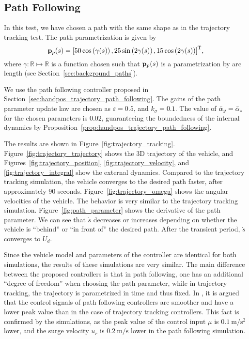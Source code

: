 \subsection{Path Following}


In this test, we have chosen a path with the same shape as in the trajectory tracking test.
The path parametrization is given by
\begin{equation}
    \mathbf{p}_p(s) = \left[50\cos\left(\gamma(s)\right), 25\sin\left(2\gamma(s)\right), 15\cos\left(2\gamma(s)\right)\right]^{\mathrm{T}}\!,
\end{equation}
where $\gamma: \mathbb{R} \mapsto \mathbb{R}$ is a function chosen such that $\mathbf{p}_p(s)$ is a parametrization by arc length (see Section~\ref{sec:background_paths}).

We use the path following controller proposed in Section~\ref{sec:handpos_trajectory_path_following}.
The gains of the path parameter update law are chosen as $\varepsilon = 0.5$, and $k_{\sigma} = 0.1$.
The value of $\Bar{\alpha}_y = \Bar{\alpha}_z$ for the chosen parameters is $0.02$, guaranteeing the boundedness of the internal dynamics by Proposition~\ref{prop:handpos_trajectory_path_following}.

The results are shown in Figure~\ref{fig:trajectory_tracking}.
Figure~\ref{fig:trajectory_trajectory} shows the 3D trajectory of the vehicle, and Figures~\ref{fig:trajectory_position}, \ref{fig:trajectory_velocity}, and \ref{fig:trajectory_integral} show the external dynamics.
Compared to the trajectory tracking simulation, the vehicle converges to the desired path faster, after approximately $90$ seconds.
Figure~\ref{fig:trajectory_omega} shows the angular velocities of the vehicle.
The behavior is very similar to the trajectory tracking simulation.
Figure~\ref{fig:path_parameter} shows the derivative of the path parameter.
We can see that $\dot{s}$ decreases or increases depending on whether the vehicle is ``behind'' or ``in front of'' the desired path.
After the transient period, $\dot{s}$ converges to $U_d$.

Since the vehicle model and parameters of the controller are identical for both simulations, the results of these simulations are very similar.
The main difference between the proposed controllers is that in path following, one has an additional ``degree of freedom'' when choosing the path parameter, while in trajectory tracking, the trajectory is parametrized in time and thus fixed.
In \cite{aguiar_trajectory_tracking_2007}, it is argued that the control signals of path following controllers are smoother and have a lower peak value than in the case of trajectory tracking controllers.
This fact is confirmed by the simulations, as the peak value of the control input $\mu$ is $\SI{0.1}{\meter\per\second\squared}$ lower, and the surge velocity $u_r$ is $\SI{0.2}{\meter\per\second}$ lower in the path following simulation.

